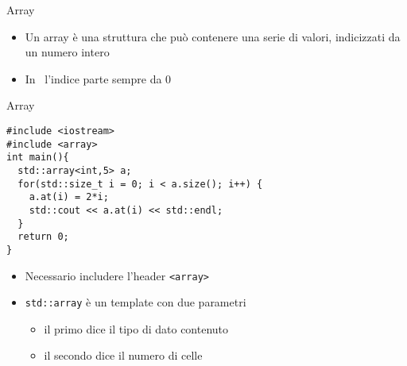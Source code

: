 \begin{frame}[fragile]{Array}
  \vfill
  \begin{center}\end{center}
  \vfill
  \begin{itemize}
    \item Un \alert{array} è una struttura che può contenere una serie di valori,
    indicizzati da un numero intero
    \vfill
    \item In \CC\ l'indice parte sempre da 0
  \end{itemize}
  \vfill
\end{frame}

\begin{frame}[fragile]{Array}
  \vfill
  \begin{lstlisting}
#include <iostream>
#include <array>
int main(){
  std::array<int,5> a;
  for(std::size_t i = 0; i < a.size(); i++) {
    a.at(i) = 2*i;
    std::cout << a.at(i) << std::endl;
  }
  return 0;
}
  \end{lstlisting}
  \vfill
  \begin{itemize}
    \item Necessario includere l'header \lstinline$<array>$
    \vfill
    \item \lstinline$std::array$ è un template con due parametri
    \begin{itemize}
      \item il primo dice il tipo di dato contenuto
      \item il secondo dice il numero di celle
    \end{itemize}
  \end{itemize}
  \vfill
\end{frame}

